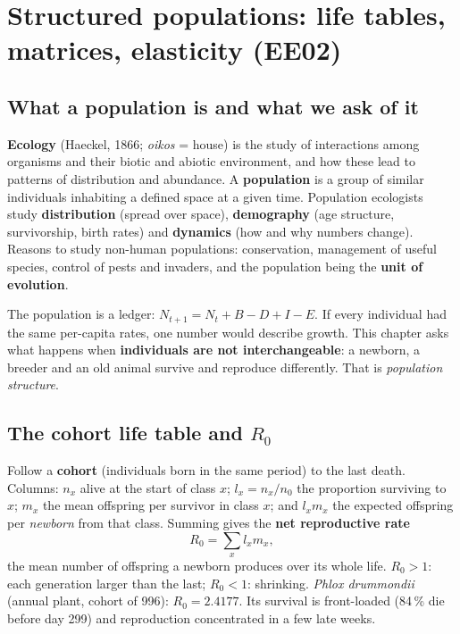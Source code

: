 \section{Structured populations: life tables, matrices, elasticity (EE02)}

\subsection{What a population is and what we ask of it}
\textbf{Ecology} (Haeckel, 1866; \emph{oikos} = house) is the study of interactions among organisms and their biotic
and abiotic environment, and how these lead to patterns of distribution and abundance. A \textbf{population} is a
group of similar individuals inhabiting a defined space at a given time. Population ecologists study
\textbf{distribution} (spread over space), \textbf{demography} (age structure, survivorship, birth rates) and
\textbf{dynamics} (how and why numbers change). Reasons to study non-human populations: conservation, management of
useful species, control of pests and invaders, and the population being the \textbf{unit of evolution}.

The population is a ledger: $N_{t+1}=N_t+B-D+I-E$. If every individual had the same per-capita rates, one number
would describe growth. This chapter asks what happens when \textbf{individuals are not interchangeable}: a newborn, a
breeder and an old animal survive and reproduce differently. That is \emph{population structure}.

\subsection{The cohort life table and $R_0$}
Follow a \textbf{cohort} (individuals born in the same period) to the last death. Columns: $n_x$ alive at the start of
class $x$; $l_x=n_x/n_0$ the proportion surviving to $x$; $m_x$ the mean offspring per survivor in class $x$; and
$l_xm_x$ the expected offspring per \emph{newborn} from that class. Summing gives the \textbf{net reproductive rate}
\[
R_0=\sum_x l_x m_x ,
\]
the mean number of offspring a newborn produces over its whole life. $R_0>1$: each generation larger than the last;
$R_0<1$: shrinking. \emph{Phlox drummondii} (annual plant, cohort of 996): $R_0=2.4177$. Its survival is front-loaded
(84\,\% die before day 299) and reproduction concentrated in a few late weeks.

